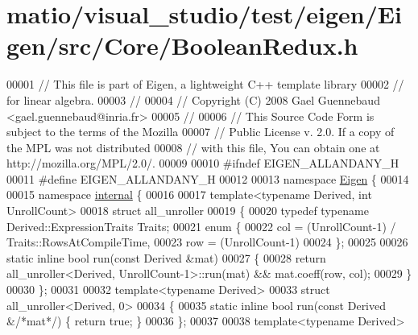 \hypertarget{matio_2visual__studio_2test_2eigen_2_eigen_2src_2_core_2_boolean_redux_8h_source}{}\section{matio/visual\+\_\+studio/test/eigen/\+Eigen/src/\+Core/\+Boolean\+Redux.h}
\label{matio_2visual__studio_2test_2eigen_2_eigen_2src_2_core_2_boolean_redux_8h_source}

\begin{DoxyCode}
00001 \textcolor{comment}{// This file is part of Eigen, a lightweight C++ template library}
00002 \textcolor{comment}{// for linear algebra.}
00003 \textcolor{comment}{//}
00004 \textcolor{comment}{// Copyright (C) 2008 Gael Guennebaud <gael.guennebaud@inria.fr>}
00005 \textcolor{comment}{//}
00006 \textcolor{comment}{// This Source Code Form is subject to the terms of the Mozilla}
00007 \textcolor{comment}{// Public License v. 2.0. If a copy of the MPL was not distributed}
00008 \textcolor{comment}{// with this file, You can obtain one at http://mozilla.org/MPL/2.0/.}
00009 
00010 \textcolor{preprocessor}{#ifndef EIGEN\_ALLANDANY\_H}
00011 \textcolor{preprocessor}{#define EIGEN\_ALLANDANY\_H}
00012 
00013 \textcolor{keyword}{namespace }\hyperlink{namespace_eigen}{Eigen} \{ 
00014 
00015 \textcolor{keyword}{namespace }\hyperlink{namespaceinternal}{internal} \{
00016 
00017 \textcolor{keyword}{template}<\textcolor{keyword}{typename} Derived, \textcolor{keywordtype}{int} UnrollCount>
00018 \textcolor{keyword}{struct }all\_unroller
00019 \{
00020   \textcolor{keyword}{typedef} \textcolor{keyword}{typename} Derived::ExpressionTraits Traits;
00021   \textcolor{keyword}{enum} \{
00022     col = (UnrollCount-1) / Traits::RowsAtCompileTime,
00023     row = (UnrollCount-1) %
00024   \};
00025 
00026   \textcolor{keyword}{static} \textcolor{keyword}{inline} \textcolor{keywordtype}{bool} run(\textcolor{keyword}{const} Derived &mat)
00027   \{
00028     \textcolor{keywordflow}{return} all\_unroller<Derived, UnrollCount-1>::run(mat) && mat.coeff(row, col);
00029   \}
00030 \};
00031 
00032 \textcolor{keyword}{template}<\textcolor{keyword}{typename} Derived>
00033 \textcolor{keyword}{struct }all\_unroller<Derived, 0>
00034 \{
00035   \textcolor{keyword}{static} \textcolor{keyword}{inline} \textcolor{keywordtype}{bool} run(\textcolor{keyword}{const} Derived &\textcolor{comment}{/*mat*/}) \{ \textcolor{keywordflow}{return} \textcolor{keyword}{true}; \}
00036 \};
00037 
00038 \textcolor{keyword}{template}<\textcolor{keyword}{typename} Derived>

\end{DoxyCode}
